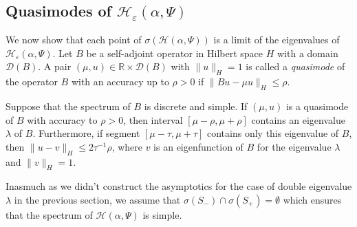 \documentclass[11pt,english]{amsart}%
\begin{document}
\subsection{Quasimodes of $\mathcal{H}_{\varepsilon}(\alpha,\Psi)$}
We now show that each  point of $\sigma(\mathcal{H}(\alpha,\Psi))$ is a limit of
the eigenvalues of  $\mathcal{H}_{\varepsilon}(\alpha,\Psi)$.
Let $B$ be a self-adjoint operator in Hilbert space  $H$ with a domain
$\mathcal{D}(B)$. A pair $(\mu, u)\in \mathbb{R}\times\mathcal{D}(B)$ with $\|u\|_H=1$
is called a \emph{quasimode} of the operator $B$ with an accuracy up to $\rho>0$ if $\|Bu-\mu u\|_H\leq \rho$.


\begin{g_lemma}\label{LemmaVishik} Suppose that the spectrum of $B$ is discrete and simple. If $(\mu, u)$ is a quasimode of $B$ with accuracy to $\rho>0$, then interval  $[\mu-\rho,\mu+\rho]$ contains an eigenvalue $\lambda$ of $B$.
Furthermore, if segment $[\mu-\tau,\mu+\tau]$ contains only this eigenvalue of $B$, then $\|u-v\|_H\leq 2\tau^{-1}\rho$, where $v$ is an eigenfunction of $B$ for the eigenvalue $\lambda$ and $\|v\|_H=1$.
\rm{\cite{LazutkinVINITI34, VishykLust}}
\end{g_lemma}

Inasmuch as we didn't construct the asymptotics for the case of double eigenvalue $\lambda$ in the previous section, we assume that $\sigma(S_-)\cap\sigma(S_+)=\emptyset$ which ensures that  the spectrum of $\mathcal{H}(\alpha,\Psi)$ is simple.
\end{document}
